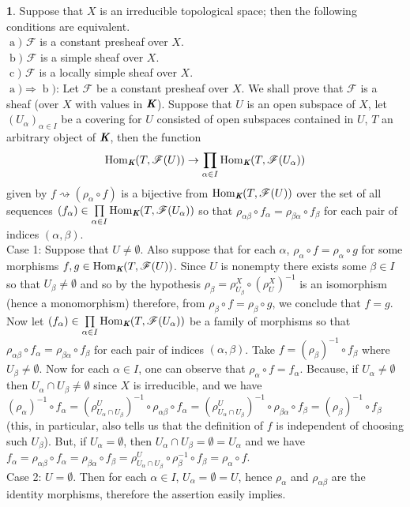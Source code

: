 \documentclass[12pt]{amsart}
\newcommand{\Hom}{\operatorname{Hom}}
\newcommand{\leta}{\operatorname{a}}
\newcommand{\letb}{\operatorname{b}}
\newcommand{\letc}{\operatorname{c}}
\theoremstyle{definition}
\newtheorem{bk}[proposition]{}
\begin{document}
\begin{bk}\label{I: 3.6.2} Suppose that $X$ is an irreducible topological space; then the following conditions are equivalent. \\
$\leta)$ $\mathscr{F}$ is a constant presheaf over $X$.\\
$\letb)$ $\mathscr{F}$ is a simple sheaf over $X$.\\
$\letc)$ $\mathscr{F}$ is a locally simple sheaf over $X$.\\

$\leta)\Rightarrow\letb)$: Let $\mathscr{F}$ be a constant presheaf over $X$. We shall prove that $\mathscr{F}$ is a sheaf (over $X$ with values in $\emph{\textbf{K}}$). Suppose that $U$ is an open subspace of $X$, let $(U_{\alpha})_{\alpha\in I}$ be a covering for $U$ consisted of open subspaces contained in $U$, $T$ an arbitrary object of $\emph{\textbf{K}}$, then the function $$\Hom_{\emph{\textbf{K}}}(T,\mathscr{F}(U))
\rightarrow\prod\limits_{\alpha\in I} \Hom_{\emph{\textbf{K}}}(T,\mathscr{F}(U_{\alpha}))$$ given by $f\rightsquigarrow(\rho_{\alpha}\circ f)$ is a bijective from $\Hom_{\emph{\textbf{K}}}(T,\mathscr{F}(U))$ over the set of all sequences $(f_{\alpha})\in\prod\limits_{\alpha\in I} \Hom_{\emph{\textbf{K}}}(T,\mathscr{F}(U_{\alpha}))$ so that $\rho_{\alpha\beta}\circ f_{\alpha}=\rho_{\beta\alpha}\circ f_{\beta}$ for each pair of indices $(\alpha,\beta)$.\\
Case 1: Suppose that $U\neq\emptyset$. Also suppose that for each $\alpha$, $\rho_{\alpha}\circ f=\rho_{\alpha}\circ g$ for some morphisms $f, g\in\Hom_{\emph{\textbf{K}}}(T,\mathscr{F}(U))$. Since $U$ is nonempty there exists some $\beta\in I$ so that $U_{\beta}\neq\emptyset$ and so by the hypothesis $\rho_{\beta}=\rho_{U_{\beta}}^{X}\circ(\rho_{U}^{X})^{-1}$ is an isomorphism (hence a monomorphism) therefore, from $\rho_{\beta}\circ f=\rho_{\beta}\circ g$, we conclude that $f=g$. Now let $(f_{\alpha})\in\prod\limits_{\alpha\in I} \Hom_{\emph{\textbf{K}}}(T,\mathscr{F}(U_{\alpha}))$ be a family of morphisms so that $\rho_{\alpha\beta}\circ f_{\alpha}=\rho_{\beta\alpha}\circ f_{\beta}$ for each pair of indices $(\alpha,\beta)$. Take $f=(\rho_{\beta})^{-1}\circ f_{\beta}$ where $U_{\beta}\neq\emptyset$. Now for each $\alpha\in I$, one can observe that $\rho_{\alpha}\circ f=f_{\alpha}$. Because, if $U_{\alpha}\neq\emptyset$ then $U_{\alpha}\cap U_{\beta}\neq\emptyset$ since $X$ is irreducible, and we have $(\rho_{\alpha})^{-1}\circ f_{\alpha}=(\rho_{U_{\alpha}\cap U_{\beta}}^{U})^{-1}\circ\rho_{\alpha\beta}\circ f_{\alpha}=(\rho_{U_{\alpha}\cap U_{\beta}}^{U})^{-1}\circ\rho_{\beta\alpha}\circ f_{\beta}=(\rho_{\beta})^{-1}\circ f_{\beta}$ (this, in particular, also tells us that the definition of $f$ is independent of choosing such  $U_{\beta}$). But, if $U_{\alpha}=\emptyset$, then $U_{\alpha}\cap U_{\beta}=\emptyset=U_{\alpha}$ and we have $f_{\alpha}=\rho_{\alpha\beta}\circ f_{\alpha}=\rho_{\beta\alpha}\circ f_{\beta}=\rho_{U_{\alpha}\cap U_{\beta}}^{U}\circ\rho_{\beta}^{-1}\circ f_{\beta}=\rho_{\alpha}\circ f$.\\ Case 2: $U=\emptyset$. Then for each $\alpha\in I$, $U_{\alpha}=\emptyset=U$, hence $\rho_{\alpha}$ and $\rho_{\alpha\beta}$ are the identity morphisms, therefore the assertion easily implies.\\

\end{bk}
\end{document}
